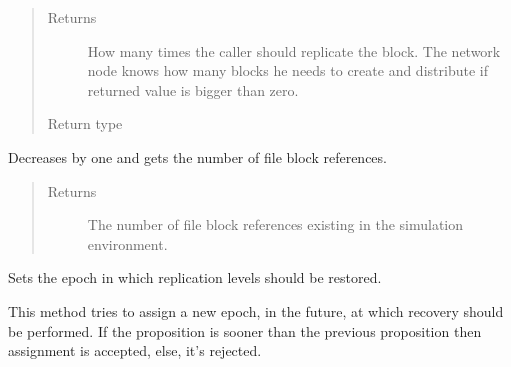 \documentclass[letterpaper,10pt,english]{sphinxmanual}
\begin{document}
\begin{fulllineitems}
\begin{fulllineitems}
\begin{quote}
\begin{description}
\item[{Returns}] \leavevmode
How many times the caller should replicate the block. The network
node knows how many blocks he needs to create and distribute if
returned value is bigger than zero.

\item[{Return type}] \leavevmode
{}

\end{description}\end{quote}

\end{fulllineitems}


\begin{fulllineitems}
\label{\detokenize{app.domain.helpers:app.domain.helpers.smart_dataclasses.FileBlockData.decrement_and_get_references}}
Decreases by one and gets the number of file block references.
\begin{quote}\begin{description}
\item[{Returns}] \leavevmode
The number of file block references existing in the simulation
environment.

\end{description}\end{quote}

\end{fulllineitems}


\begin{fulllineitems}
\label{\detokenize{app.domain.helpers:app.domain.helpers.smart_dataclasses.FileBlockData.set_replication_epoch}}
Sets the epoch in which replication levels should be restored.

This method tries to assign a new epoch, in the future, at which
recovery should be performed. If the proposition is sooner than the
previous proposition then assignment is accepted, else, it’s rejected.


\end{fulllineitems}
\end{fulllineitems}
\end{document}
